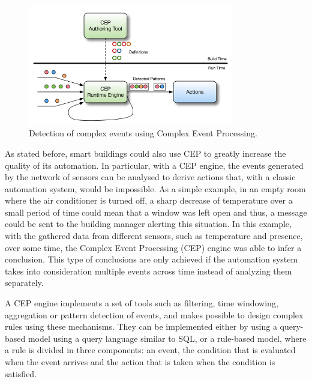 \begin{figure}[H]
	\centering
	\includegraphics[width=0.8\textwidth]{figures/cep1.png}
	\caption{Detection of complex events using Complex Event Processing.}
	\label{fig:cep}
\end{figure}

As stated before, smart buildings could also use CEP to greatly increase the quality of its automation. In particular, with a CEP engine, the events generated by the network of sensors can be analysed to derive actions that, with a classic automation system, would be impossible. As a simple example, in an empty room where the air conditioner is turned off, a sharp decrease of temperature over a small period of time could mean that a window was left open and thus, a message could be sent to the building manager alerting this situation. In this example, with the gathered data from different sensors, such as temperature and presence, over some time, the Complex Event Processing (CEP) engine was able to infer a conclusion. This type of conclusions are only achieved if the automation system takes into consideration multiple events across time instead of analyzing them separately.


A CEP engine implements a set of tools such as filtering, time windowing, aggregation or pattern detection of events, and makes possible to design complex rules using these mechanisms. They can be implemented either by using a query-based model using a query language similar to SQL, or a rule-based model, where a rule is divided in three components: an event, the condition that is evaluated when the event arrives and the action that is taken when the condition is satisfied.

